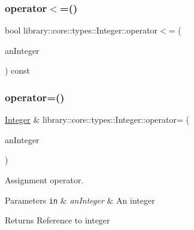 \subsubsection{\texorpdfstring{operator$<$=()}{operator<=()}\hspace{0.1cm}{\footnotesize\ttfamily [2/2]}}
{\footnotesize\ttfamily bool library\+::core\+::types\+::\+Integer\+::operator$<$= (\begin{DoxyParamCaption}\item[{const \hyperlink{classlibrary_1_1core_1_1types_1_1_integer_a623afb1580f870fd8a1997b1c12c917d}{Integer\+::\+Value\+Type} \&}]{an\+Integer }\end{DoxyParamCaption}) const}

\mbox{\label{classlibrary_1_1core_1_1types_1_1_integer_ab77cae94a9e6d4a405a555dd55763ea2}} 
\subsubsection{\texorpdfstring{operator=()}{operator=()}}
{\footnotesize\ttfamily \hyperlink{classlibrary_1_1core_1_1types_1_1_integer}{Integer} \& library\+::core\+::types\+::\+Integer\+::operator= (\begin{DoxyParamCaption}\item[{\hyperlink{classlibrary_1_1core_1_1types_1_1_integer_a623afb1580f870fd8a1997b1c12c917d}{Integer\+::\+Value\+Type}}]{an\+Integer }\end{DoxyParamCaption})}



Assignment operator. 


\begin{DoxyParams}[1]{Parameters}
\mbox{\tt in}  & {\em an\+Integer} & An integer \\
\hline
\end{DoxyParams}
\begin{DoxyReturn}{Returns}
Reference to integer 
\end{DoxyReturn}
\mbox{\label{classlibrary_1_1core_1_1types_1_1_integer_a52b3a012d6c6779773d051800daac516}} 
